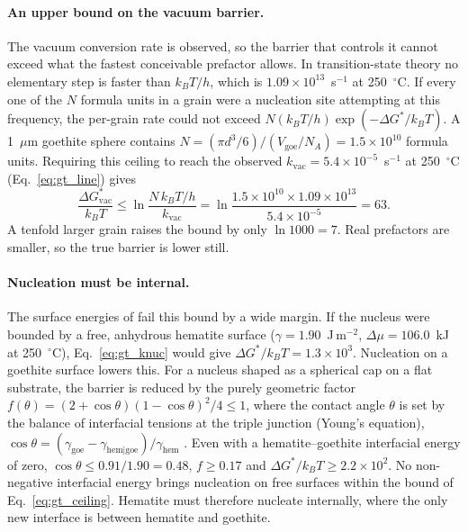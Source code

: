 \paragraph{An upper bound on the vacuum barrier.} The vacuum conversion rate is observed, so the
barrier that controls it cannot exceed what the fastest conceivable prefactor allows. In
transition-state theory \citep{eyring1935} no elementary step is faster than $k_BT/h$, which is
$1.09\times10^{13}$~s$^{-1}$ at 250~$^\circ$C. If every one of the $N$ formula units in a grain were a
nucleation site attempting at this frequency, the per-grain rate could not exceed
$N(k_BT/h)\exp(-\Delta G^{*}/k_BT)$. A 1~$\mu$m goethite sphere contains
$N = (\pi d^3/6)/(V_{\mathrm{goe}}/N_A) = 1.5\times10^{10}$ formula units. Requiring this ceiling to
reach the observed $k_{\mathrm{vac}} = 5.4\times10^{-5}$~s$^{-1}$ at 250~$^\circ$C (Eq.~\ref{eq:gt_line})
gives
\begin{equation}
  \frac{\Delta G^{*}_{\mathrm{vac}}}{k_BT} \le \ln\frac{N\,k_BT/h}{k_{\mathrm{vac}}}
  = \ln\frac{1.5\times10^{10}\times1.09\times10^{13}}{5.4\times10^{-5}} = 63 .
  \label{eq:gt_ceiling}
\end{equation}
A tenfold larger grain raises the bound by only $\ln 1000 = 7$. Real prefactors are smaller, so the
true barrier is lower still.

\paragraph{Nucleation must be internal.} The surface energies of \citet{navrotsky2008} fail this
bound by a wide margin. If the nucleus were bounded by a free, anhydrous hematite surface
($\gamma = 1.90$~J\,m$^{-2}$, $\Delta\mu = 106.0$~kJ at 250~$^\circ$C), Eq.~\ref{eq:gt_knuc} would give
$\Delta G^{*}/k_BT = 1.3\times10^{3}$. Nucleation on a goethite surface lowers this. For a nucleus
shaped as a spherical cap on a flat substrate, the barrier is reduced by the purely geometric
factor
$f(\theta) = (2+\cos\theta)(1-\cos\theta)^2/4 \le 1$, where the contact angle $\theta$ is set by the
balance of interfacial tensions at the triple junction (Young's equation),
$\cos\theta = (\gamma_{\mathrm{goe}} - \gamma_{\mathrm{hem|goe}})/\gamma_{\mathrm{hem}}$
\citep{volmer1926,turnbull1950}. Even with a hematite--goethite interfacial energy of zero,
$\cos\theta \le 0.91/1.90 = 0.48$, $f\ge0.17$ and $\Delta G^{*}/k_BT\ge2.2\times10^{2}$. No
non-negative interfacial energy brings nucleation on free surfaces within the bound of
Eq.~\ref{eq:gt_ceiling}. Hematite must therefore nucleate internally, where the only new
interface is between hematite and goethite.

